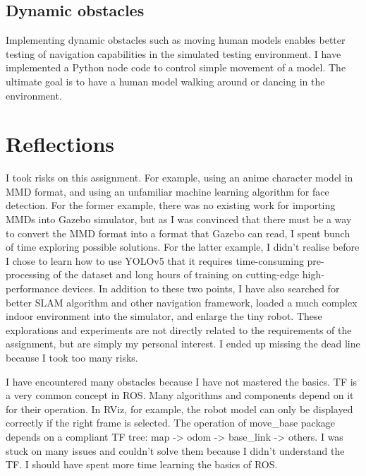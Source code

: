 \subsection{Dynamic obstacles}

Implementing dynamic obstacles such as moving human models enables better testing of navigation capabilities in the simulated testing environment. I have implemented a Python node code to control simple movement of a model. The ultimate goal is to have a human model walking around or dancing in the environment.


\section{Reflections}

I took risks on this assignment. For example, using an anime character model in MMD format, and using an unfamiliar machine learning algorithm for face detection. For the former example, there was no existing work for importing MMDs into Gazebo simulator, but as I was convinced that there must be a way to convert the MMD format into a format that Gazebo can read, I spent bunch of time exploring possible solutions. For the latter example, I didn't realise before I chose to learn how to use YOLOv5 that it requires time-consuming pre-processing of the dataset and long hours of training on cutting-edge high-performance devices. In addition to these two points, I have also searched for better SLAM algorithm and other navigation framework, loaded a much complex indoor environment into the simulator, and enlarge the tiny robot. These explorations and experiments are not directly related to the requirements of the assignment, but are simply my personal interest. I ended up missing the dead line because I took too many risks.

I have encountered many obstacles because I have not mastered the basics. TF is a very common concept in ROS. Many algorithms and components depend on it for their operation. In RViz, for example, the robot model can only be displayed correctly if the right frame is selected. The operation of move\_base package depends on a compliant TF tree: map -> odom -> base\_link -> others. I was stuck on many issues and couldn't solve them because I didn't understand the TF. I should have spent more time learning the basics of ROS.
